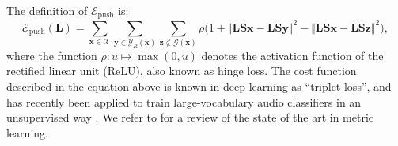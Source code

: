 \documentclass{bmcart}
\begin{document}
The definition of $\mathcal{E}_{\textrm{push}}$ is:
\begin{equation}
\mathcal{E}_{\textrm{push}} (\mathbf{L}) =
\sum_{\boldsymbol{x}\in\mathcal{X}}
\sum_{\boldsymbol{y}\in\mathcal{Y}_R (\boldsymbol{x})}
\sum_{\boldsymbol{z}\not\in\mathcal{G}(\boldsymbol{x})}
\rho
\Big(
1 +
\big\Vert
\mathbf{L}\mathbf{\widetilde{S}}\boldsymbol{x} - \mathbf{L}\mathbf{\widetilde{S}}\boldsymbol{y}
\big\Vert^2
-
\big\Vert
\mathbf{L}\mathbf{\widetilde{S}}\boldsymbol{x} - \mathbf{L}\mathbf{\widetilde{S}}\boldsymbol{z}
\big\Vert^2
\Big),
\end{equation}
where the function $\rho : u \mapsto \max (0, u)$ denotes the activation function of the rectified linear unit (ReLU), also known as hinge loss.
The cost function described in the equation above is known in deep learning as ``triplet loss'', and has recently been applied to train large-vocabulary audio classifiers in an unsupervised way \cite{jansen2018icassp}.
We refer to \cite{bellet2015book} for a review of the state of the art in metric learning.







\end{document}
